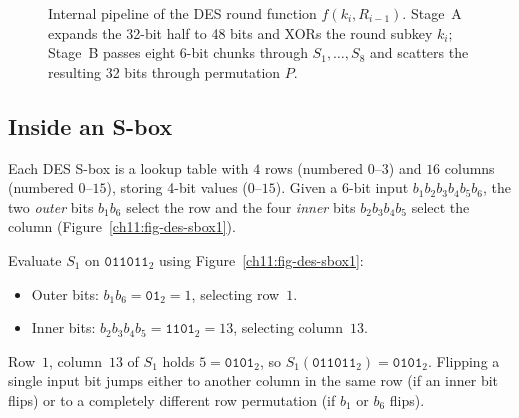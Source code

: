 \begin{figure}[htbp]
\caption{Internal pipeline of the DES round function $f(k_i, R_{i-1})$. Stage~A expands the 32-bit half to 48 bits and XORs the round subkey $k_i$; Stage~B passes eight 6-bit chunks through $S_1,\dots,S_8$ and scatters the resulting 32 bits through permutation $P$.}
\label{ch11:fig-des-round-function}
\end{figure}

\subsection{Inside an S-box}

Each DES S-box is a lookup table with $4$ rows (numbered $0$--$3$) and $16$ columns (numbered $0$--$15$), storing 4-bit values ($0$--$15$). Given a 6-bit input $b_1 b_2 b_3 b_4 b_5 b_6$, the two \emph{outer} bits $b_1 b_6$ select the row and the four \emph{inner} bits $b_2 b_3 b_4 b_5$ select the column (Figure~\ref{ch11:fig-des-sbox1}).

\begin{example}
\label{ch11:ex-sbox}
Evaluate $S_1$ on $\texttt{011011}_2$ using Figure~\ref{ch11:fig-des-sbox1}:
\begin{itemize}
  \item Outer bits: $b_1 b_6 = \texttt{01}_2 = 1$, selecting row~$1$.
  \item Inner bits: $b_2 b_3 b_4 b_5 = \texttt{1101}_2 = 13$, selecting column~$13$.
\end{itemize}
Row~$1$, column~$13$ of $S_1$ holds $5 = \texttt{0101}_2$, so $S_1(\texttt{011011}_2) = \texttt{0101}_2$. Flipping a single input bit jumps either to another column in the same row (if an inner bit flips) or to a completely different row permutation (if $b_1$ or $b_6$ flips).
\end{example}

